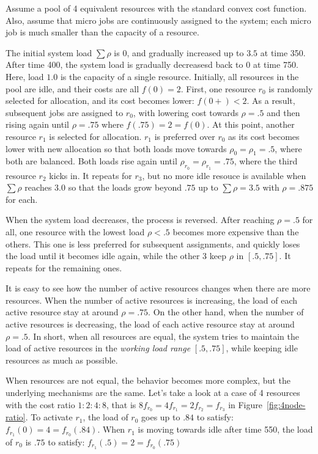 Assume a pool of 4 equivalent resources with the standard convex
cost function.
Also, assume that micro jobs are continuously assigned to the
system; each micro job is much smaller than the capacity of a
resource.

The initial system load $\sum \rho$ is $0$, and gradually increased up
to $3.5$ at time 350. After time 400, the system load is gradually
decreasesd back to $0$ at time 750.
Here, load $1.0$ is the capacity of a single resource. 
Initially, all resources in the pool are idle, and their costs are
all $f(0)= 2$.
First, one resource $r_{0}$ is randomly selected for allocation, and its
cost becomes lower: $f(0+) < 2$. As a result, subsequent jobs are
assigned to $r_{0}$, with lowering cost towards $\rho = .5$ and then
rising again until $\rho = .75$ where $f(.75) = 2 = f(0)$.
At this point, another resource $r_{1}$ is selected for allocation.
$r_{1}$ is preferred over $r_{0}$ as its cost becomes lower with new
allocation so that both loads move towards $\rho_{0} = \rho_{1} = .5$,
where both are balanced.
Both loads rise again until $\rho_{r_{0}} = \rho_{r_{1}} = .75$,
where the third resource $r_{2}$ kicks in.
It repeats for $r_{3}$, but no more idle resouce is available
when $\sum \rho$ reaches $3.0$ so that the loads grow beyond $.75$
up to $\sum \rho = 3.5$ with $\rho = .875$ for each.

When the system load decreases, the process is reversed.
After reaching $\rho = .5$ for all,
one resource with the lowest load $\rho < .5$ becomes more expensive
than the others.
This one is less preferred for subsequent assignments, and quickly
loses the load until it becomes idle again, while the other 3 keep
$\rho$ in $[.5, .75]$. It repeats for the remaining ones.

It is easy to see how the number of active resources changes when
there are more resources.
When the number of active resources is increasing, the load of each
active resource stay at around $\rho = .75$.
On the other hand, when the number of active resources is decreasing,
the load of each active resource stay at around $\rho = .5$.
In short, when all resources are equal, the system tries to maintain
the load of active resources in the {\em working load range}
$[.5, .75]$, while keeping idle resources as much as possible.

When resources are not equal, the behavior becomes more complex, but
the underlying mechanisms are the same.
Let's take a look at a case of 4 resources with the cost ratio $1:2:4:8$,
that is $8 f_{r_{0}} = 4 f_{r_{1}} = 2 f_{r_{2}} = f_{r_{3}}$ in
Figure~\ref{fig:4node-ratio}.
To activate $r_{1}$, the load of $r_{0}$ goes up to $.84$ to satisfy:
$f_{r_{1}}(0) = 4 = f_{r_{0}}(.84)$.
When $r_{1}$ is moving towards idle after time 550, the load
of $r_{0}$ is $.75$ to satisfy: $f_{r_{1}}(.5) = 2 = f_{r_{0}}(.75)$

